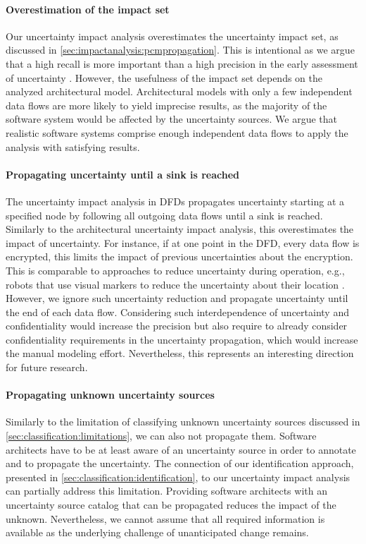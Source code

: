 \paragraph{Overestimation of the impact set}
Our uncertainty impact analysis overestimates the uncertainty impact set, as discussed in \autoref{sec:impactanalysis:pcmpropagation}.
This is intentional as we argue that a high recall is more important than a high precision in the early assessment of uncertainty \cite{hahner_architecture-based_2023}.
However, the usefulness of the impact set depends on the analyzed architectural model.
Architectural models with only a few independent data flows are more likely to yield imprecise results, as the majority of the software system would be affected by the uncertainty sources.
We argue that realistic software systems comprise enough independent data flows \cite{schneider_microsecend_2023} to apply the analysis with satisfying results.

\paragraph{Propagating uncertainty until a sink is reached}
The uncertainty impact analysis in \acp{DFD} propagates uncertainty starting at a specified node by following all outgoing data flows until a sink is reached.
Similarly to the architectural uncertainty impact analysis, this overestimates the impact of uncertainty.
For instance, if at one point in the \ac{DFD}, every data flow is encrypted, this limits the impact of previous uncertainties about the encryption.
This is comparable to approaches to reduce uncertainty during operation, e.g., robots that use visual markers to reduce the uncertainty about their location \cite{camara_software_2020}.
However, we ignore such uncertainty reduction and propagate uncertainty until the end of each data flow.
Considering such interdependence of uncertainty and confidentiality would increase the precision but also require to already consider confidentiality requirements in the uncertainty propagation, which would increase the manual modeling effort.
Nevertheless, this represents an interesting direction for future research.

\paragraph{Propagating unknown uncertainty sources}
Similarly to the limitation of classifying unknown uncertainty sources discussed in \autoref{sec:classification:limitations}, we can also not propagate them.
Software architects have to be at least aware of an uncertainty source in order to annotate and to propagate the uncertainty.
The connection of our identification approach, presented in \autoref{sec:classification:identification}, to our uncertainty impact analysis can partially address this limitation.
Providing software architects with an uncertainty source catalog that can be propagated reduces the impact of the unknown.
Nevertheless, we cannot assume that all required information is available as the underlying challenge of unanticipated change remains.

